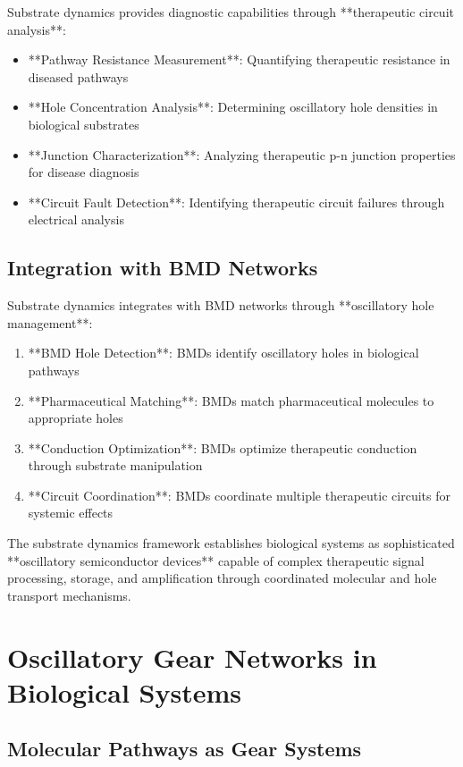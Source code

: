 Substrate dynamics provides diagnostic capabilities through **therapeutic circuit analysis**:

\begin{itemize}
\item **Pathway Resistance Measurement**: Quantifying therapeutic resistance in diseased pathways
\item **Hole Concentration Analysis**: Determining oscillatory hole densities in biological substrates
\item **Junction Characterization**: Analyzing therapeutic p-n junction properties for disease diagnosis
\item **Circuit Fault Detection**: Identifying therapeutic circuit failures through electrical analysis
\end{itemize}

\subsection{Integration with BMD Networks}

Substrate dynamics integrates with BMD networks through **oscillatory hole management**:

\begin{enumerate}
\item **BMD Hole Detection**: BMDs identify oscillatory holes in biological pathways
\item **Pharmaceutical Matching**: BMDs match pharmaceutical molecules to appropriate holes
\item **Conduction Optimization**: BMDs optimize therapeutic conduction through substrate manipulation
\item **Circuit Coordination**: BMDs coordinate multiple therapeutic circuits for systemic effects
\end{enumerate}

The substrate dynamics framework establishes biological systems as sophisticated **oscillatory semiconductor devices** capable of complex therapeutic signal processing, storage, and amplification through coordinated molecular and hole transport mechanisms.

\section{Oscillatory Gear Networks in Biological Systems}

\subsection{Molecular Pathways as Gear Systems}


